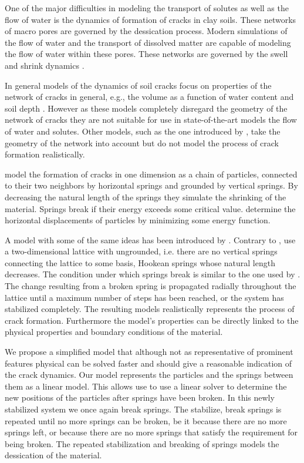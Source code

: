 One of the major difficulties in modeling the transport of solutes as well as the flow of water is the dynamics of formation of cracks in clay soils. These networks of macro pores are governed by the dessication process. Modern simulations of the flow of water and the transport of dissolved matter are capable of modeling the flow of water within these pores. These networks are governed by the swell and shrink dynamics \cite{vogel2005studies2}.

In general models of the dynamics of soil cracks focus on properties of the network of cracks in general, e.g., the volume as a function of water content and soil depth \cite{chertkov2000using}. However as these models completely disregard the geometry of the network of cracks they are not suitable for use in state-of-the-art models the flow of water and solutes. Other models, such as the one introduced by \textcite{horgan2000empirical}, take the geometry of the network into account but do not model the process of crack formation realistically. 

\textcite{kitsunezaki1999fracture} model the formation of cracks in one dimension as a chain of particles, connected to their two neighbors by horizontal springs and grounded by vertical springs. By decreasing the natural length of the springs they simulate the shrinking of the material. Springs break if their energy exceeds some critical value. \cite{kitsunezaki1999fracture} determine the horizontal displacements of particles by minimizing some energy function. 

A model with some of the same ideas has been introduced by \textcite{vogel2005studies2}. Contrary to \citeauthor{kitsunezaki1999fracture}, \citeauthor{vogel2005studies2} use a two-dimensional lattice with ungrounded, i.e. there are no vertical springs connecting the lattice to some basis, Hookean springs whose natural length decreases. The condition under which springs break is similar to the one used by \citeauthor{kitsunezaki1999fracture}. The change resulting from a broken spring is propagated radially throughout the lattice until a maximum number of steps has been reached, or the system has stabilized completely. The resulting models realistically represents the process of crack formation. Furthermore the model's properties can be directly linked to the physical properties and boundary conditions of the material.

We propose a simplified model that although not as representative of prominent features physical can be solved faster and should give a reasonable indication of the crack dynamics. Our model represents the particles and the springs between them as a linear model. This allows use to use a linear solver to determine the new positions of the particles after springs have been broken. In this newly stabilized system we once again break springs. The stabilize, break springs is repeated until no more springs can be broken, be it because there are no more springs left, or because there are no more springs that satisfy the requirement for being broken. The repeated stabilization and breaking of springs models the dessication of the material.

